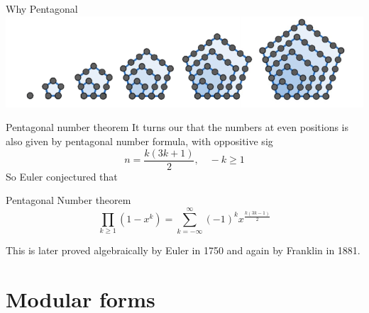 \documentclass[pdf]{beamer}
\begin{document}
\begin{frame}{Why Pentagonal}
    \includegraphics{The first six pentagonal number}
\end{frame}
\begin{frame}{Pentagonal number theorem}
It turns our that the numbers at even positions is also given by pentagonal number formula, with oppositive sig
\[n = \dfrac{k(3k+1)}{2}, \quad -k \ge 1\]
So  Euler conjectured that 
\begin{block}{Pentagonal Number theorem}
    \[\prod_{k \ge 1} (1-x^k) = \sum_{k=-\infty}^\infty (-1)^kx^{\frac{k(3k-1)}{2}}\]
\end{block}\pause
This is later proved algebraically by Euler in 1750 and again by Franklin in 1881.
\end{frame}
\section{Modular forms}
\end{document}
